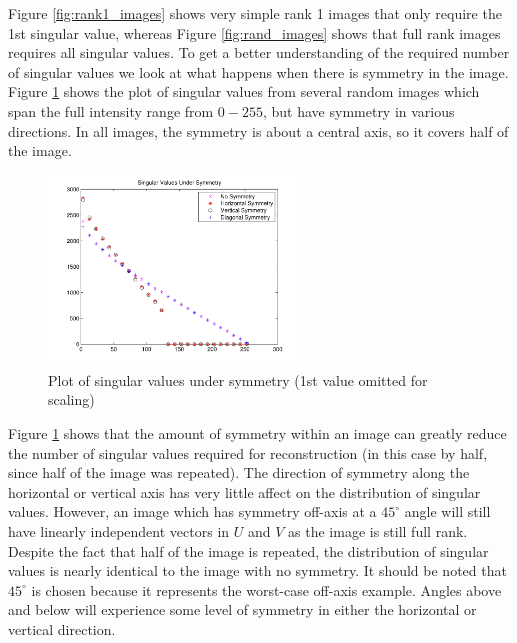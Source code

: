 \documentclass{report}
\begin{document}
Figure \ref{fig:rank1_images} shows very simple rank 1 images that only require the 1st singular value, whereas Figure \ref{fig:rand_images} shows that full rank images requires all singular values. To get a better understanding of the required number of singular values we look at what happens when there is symmetry in the image. Figure \ref{fig:rand_symmetry} shows the plot of singular values from several random images which span the full intensity range from $0-255$, but have symmetry in various directions. In all images, the symmetry is about a central axis, so it covers half of the image.

\begin{figure}[H]
        \centering
        \includegraphics[width=0.6\textwidth]{graphics/singular_values_symmetry.pdf}
        \caption{Plot of singular values under symmetry (1st value omitted for scaling)}
        \label{fig:rand_symmetry}
\end{figure}

Figure \ref{fig:rand_symmetry} shows that the amount of symmetry within an image can greatly reduce the number of singular values required for reconstruction (in this case by half, since half of the image was repeated). The direction of symmetry along the horizontal or vertical axis has very little affect on the distribution of singular values. However, an image which has symmetry off-axis at a $45^\circ$ angle will still have linearly independent vectors in $U$ and $V$ as the image is still full rank. Despite the fact that half of the image is repeated, the distribution of singular values is nearly identical to the image with no symmetry. It should be noted that $45^\circ$ is chosen because it represents the worst-case off-axis example. Angles above and below will experience some level of symmetry in either the horizontal or vertical direction.
\end{document}
